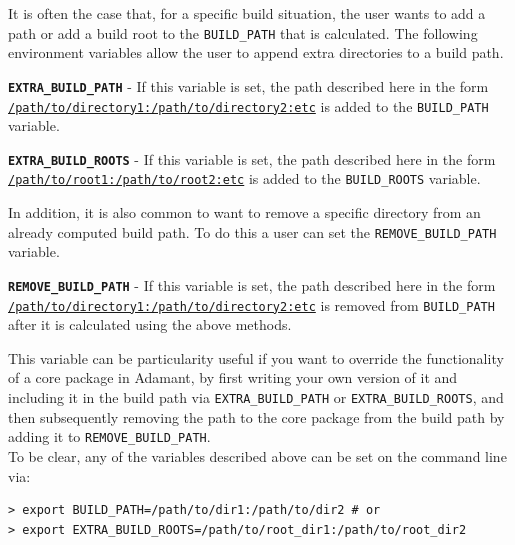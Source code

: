 It is often the case that, for a specific build situation, the user wants to add a path or add a build root to the \texttt{BUILD\_PATH} that is calculated. The following environment variables allow the user to append extra directories to a build path.

\vspace{5mm} %
\begin{spaceditemize}
  \item \textbf{\texttt{EXTRA\_BUILD\_PATH}} - If this variable is set, the path described here in the form \texttt{\url{/path/to/directory1:/path/to/directory2:etc}} is added to the \texttt{BUILD\_PATH} variable.
  \item \textbf{\texttt{EXTRA\_BUILD\_ROOTS}} - If this variable is set, the path described here in the form \texttt{\url{/path/to/root1:/path/to/root2:etc}} is added to the \texttt{BUILD\_ROOTS} variable.
\end{spaceditemize}
\vspace{5mm} %

In addition, it is also common to want to remove a specific directory from an already computed build path. To do this a user can set the \texttt{REMOVE\_BUILD\_PATH} variable.

\vspace{5mm} %
\begin{spaceditemize}
  \item \textbf{\texttt{REMOVE\_BUILD\_PATH}} - If this variable is set, the path described here in the form \texttt{\url{/path/to/directory1:/path/to/directory2:etc}} is removed from \texttt{BUILD\_PATH} after it is calculated using the above methods.
\end{spaceditemize}
\vspace{5mm} %
 
This variable can be particularity useful if you want to override the functionality of a core package in Adamant, by first writing your own version of it and including it in the build path via \texttt{EXTRA\_BUILD\_PATH} or \texttt{EXTRA\_BUILD\_ROOTS}, and then subsequently removing the path to the core package from the build path by adding it to \texttt{REMOVE\_BUILD\_PATH}. \\

To be clear, any of the variables described above can be set on the command line via:

\vspace{5mm} %
\begin{verbatim}
> export BUILD_PATH=/path/to/dir1:/path/to/dir2 # or
> export EXTRA_BUILD_ROOTS=/path/to/root_dir1:/path/to/root_dir2
\end{verbatim}
\vspace{5mm} %

